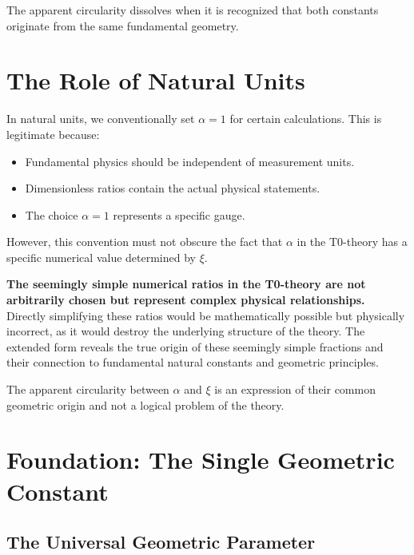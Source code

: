 \documentclass[12pt,a4paper]{article}
\begin{document}
	The apparent circularity dissolves when it is recognized that both constants originate from the same fundamental geometry.
	
	\section{The Role of Natural Units}
	\label{sec:units}
	
	In natural units, we conventionally set \(\alpha = 1\) for certain calculations. This is legitimate because:
	
	\begin{itemize}
		\item Fundamental physics should be independent of measurement units.
		\item Dimensionless ratios contain the actual physical statements.
		\item The choice \(\alpha = 1\) represents a specific gauge.
	\end{itemize}
	
	However, this convention must not obscure the fact that \(\alpha\) in the T0-theory has a specific numerical value determined by \(\xi\).
	
	\begin{tcolorbox}[colback=blue!5!white,colframe=blue!75!black]
		\textbf{The seemingly simple numerical ratios in the T0-theory are not arbitrarily chosen but represent complex physical relationships.} \\
		
		Directly simplifying these ratios would be mathematically possible but physically incorrect, as it would destroy the underlying structure of the theory. The extended form reveals the true origin of these seemingly simple fractions and their connection to fundamental natural constants and geometric principles.
		
		The apparent circularity between \(\alpha\) and \(\xi\) is an expression of their common geometric origin and not a logical problem of the theory.
	\end{tcolorbox}
	

	\section{Foundation: The Single Geometric Constant}
	
	\subsection{The Universal Geometric Parameter}
	
\end{document}
